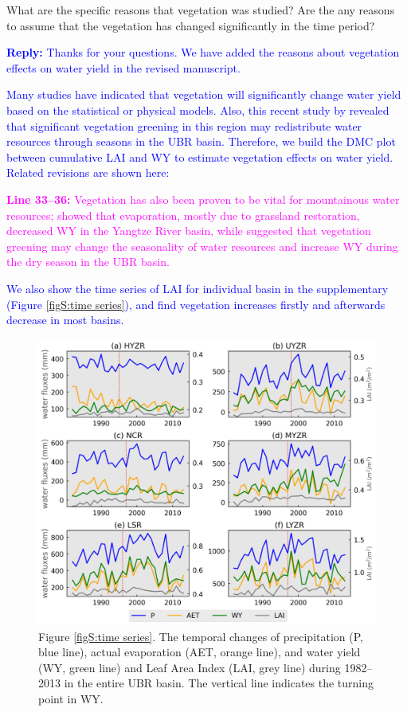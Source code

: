 \documentclass[11pt]{article}
\newcounter{reviewer}
\newcounter{point}[reviewer]
\renewcommand{\thepoint}{Comment\,\thereviewer.\arabic{point}:}
\newcommand{\point}[1]{\refstepcounter{point} \bigskip \noindent {\fontseries{b}\selectfont \thepoint} #1 \par}
\newcommand{\reply}[1]{\bigskip \textcolor{blue}{\noindent \textbf {Reply:} #1}}
\newcommand{\nextreply}[1]{\bigskip \textcolor{blue}{\noindent #1}}
\newcommand{\revised}[3][2]{\bigskip \textcolor{magenta}{\noindent \textbf{Line #2:} #3}}
\begin{document}
\point{What are the specific reasons that vegetation was studied? Are the any reasons to assume that the vegetation has changed significantly in the time period?}
\reply{Thanks for your questions. We have added the reasons about vegetation effects on water yield in the revised manuscript.}

\nextreply{Many studies have indicated that vegetation will significantly change water yield based on the statistical or physical models. Also, this recent study by \citet{li2021vegetation} revealed that significant vegetation greening in this region may redistribute water resources through seasons in the UBR basin. Therefore, we build the DMC plot between cumulative LAI and WY to estimate vegetation effects on water yield. Related revisions are shown here:}

\revised{33--36}{Vegetation has also been proven to be vital for mountainous water resources; \citet{li2017grassland} showed that evaporation, mostly due to grassland restoration, decreased WY in the Yangtze River basin, while \citet{li2021vegetation} suggested that vegetation greening may change the seasonality of water resources and increase WY during the dry season in the UBR basin.}

\nextreply{We also show the time series of LAI for individual basin in the supplementary (Figure \ref{figS:time series}), and find vegetation increases firstly and afterwards decrease in most basins.}

\begin{figure}[ht]
    \centering
    \includegraphics[width=12cm]{02-figures/time-series.png}
    \captionsetup{labelformat=empty}
    \caption{Figure \ref{figS:time series}. The temporal changes of precipitation (P, blue line), actual evaporation (AET, orange line), and water yield (WY, green line) and Leaf Area Index (LAI, grey line) during 1982--2013 in the entire UBR basin. The vertical line indicates the turning point in WY.}
\end{figure}
\end{document}
